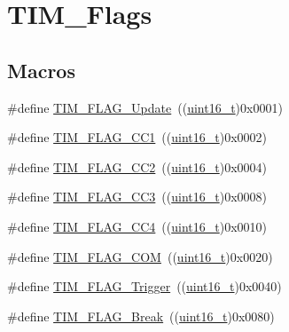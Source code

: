 \hypertarget{group___t_i_m___flags}{}\section{T\+I\+M\+\_\+\+Flags}
\label{group___t_i_m___flags}
\subsection*{Macros}
\begin{DoxyCompactItemize}
\item 
\#define \hyperlink{group___t_i_m___flags_ga97eba66f792c88e08131bd0d2a0e530d}{T\+I\+M\+\_\+\+F\+L\+A\+G\+\_\+\+Update}~((\hyperlink{_p_e___types_8h_a1f1825b69244eb3ad2c7165ddc99c956}{uint16\+\_\+t})0x0001)
\item 
\#define \hyperlink{group___t_i_m___flags_gaa7eb8be054b9bd217a9abb1c8687cc55}{T\+I\+M\+\_\+\+F\+L\+A\+G\+\_\+\+C\+C1}~((\hyperlink{_p_e___types_8h_a1f1825b69244eb3ad2c7165ddc99c956}{uint16\+\_\+t})0x0002)
\item 
\#define \hyperlink{group___t_i_m___flags_ga9cae242f1c51b31839ffc5bc007c82a7}{T\+I\+M\+\_\+\+F\+L\+A\+G\+\_\+\+C\+C2}~((\hyperlink{_p_e___types_8h_a1f1825b69244eb3ad2c7165ddc99c956}{uint16\+\_\+t})0x0004)
\item 
\#define \hyperlink{group___t_i_m___flags_ga052c380f922219659810e4fceb574a7c}{T\+I\+M\+\_\+\+F\+L\+A\+G\+\_\+\+C\+C3}~((\hyperlink{_p_e___types_8h_a1f1825b69244eb3ad2c7165ddc99c956}{uint16\+\_\+t})0x0008)
\item 
\#define \hyperlink{group___t_i_m___flags_gafd0dc57b56941f8b8250d66e289542db}{T\+I\+M\+\_\+\+F\+L\+A\+G\+\_\+\+C\+C4}~((\hyperlink{_p_e___types_8h_a1f1825b69244eb3ad2c7165ddc99c956}{uint16\+\_\+t})0x0010)
\item 
\#define \hyperlink{group___t_i_m___flags_gad454d70205ce5bbf3b3c0e7e43d6df62}{T\+I\+M\+\_\+\+F\+L\+A\+G\+\_\+\+C\+OM}~((\hyperlink{_p_e___types_8h_a1f1825b69244eb3ad2c7165ddc99c956}{uint16\+\_\+t})0x0020)
\item 
\#define \hyperlink{group___t_i_m___flags_gaeca2f17eea738dbec7eee8ecbe442814}{T\+I\+M\+\_\+\+F\+L\+A\+G\+\_\+\+Trigger}~((\hyperlink{_p_e___types_8h_a1f1825b69244eb3ad2c7165ddc99c956}{uint16\+\_\+t})0x0040)
\item 
\#define \hyperlink{group___t_i_m___flags_ga166571a1d5ca2bfca5d923eaa22f6deb}{T\+I\+M\+\_\+\+F\+L\+A\+G\+\_\+\+Break}~((\hyperlink{_p_e___types_8h_a1f1825b69244eb3ad2c7165ddc99c956}{uint16\+\_\+t})0x0080)
\item 

\end{DoxyCompactItemize}
